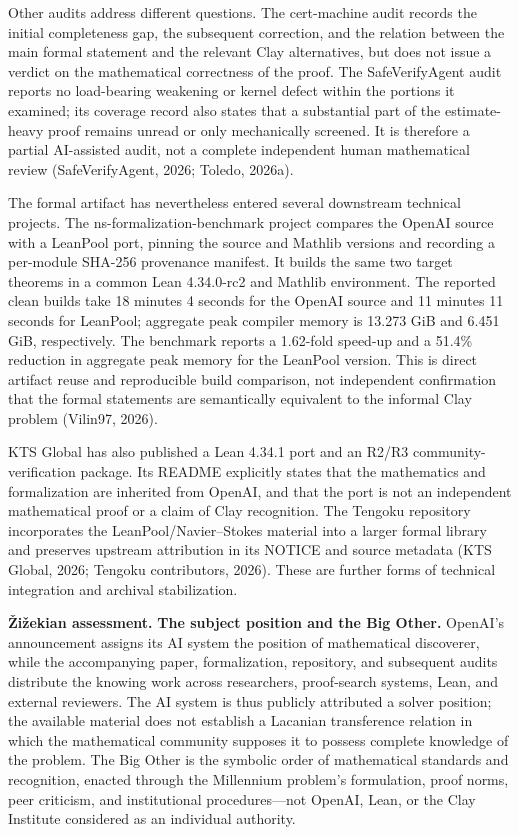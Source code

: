 \documentclass[sn-apa]{sn-jnl}
\begin{document}
Other audits address different questions. The cert-machine audit records the initial completeness gap, the subsequent correction, and the relation between the main formal statement and the relevant Clay alternatives, but does not issue a verdict on the mathematical correctness of the proof. The SafeVerifyAgent audit reports no load-bearing weakening or kernel defect within the portions it examined; its coverage record also states that a substantial part of the estimate-heavy proof remains unread or only mechanically screened. It is therefore a partial AI-assisted audit, not a complete independent human mathematical review (SafeVerifyAgent, 2026; Toledo, 2026a).

The formal artifact has nevertheless entered several downstream technical projects. The ns-formalization-benchmark project compares the OpenAI source with a LeanPool port, pinning the source and Mathlib versions and recording a per-module SHA-256 provenance manifest. It builds the same two target theorems in a common Lean 4.34.0-rc2 and Mathlib environment. The reported clean builds take 18 minutes 4 seconds for the OpenAI source and 11 minutes 11 seconds for LeanPool; aggregate peak compiler memory is 13.273 GiB and 6.451 GiB, respectively. The benchmark reports a 1.62-fold speed-up and a 51.4\% reduction in aggregate peak memory for the LeanPool version. This is direct artifact reuse and reproducible build comparison, not independent confirmation that the formal statements are semantically equivalent to the informal Clay problem (Vilin97, 2026).

KTS Global has also published a Lean 4.34.1 port and an R2/R3 community-verification package. Its README explicitly states that the mathematics and formalization are inherited from OpenAI, and that the port is not an independent mathematical proof or a claim of Clay recognition. The Tengoku repository incorporates the LeanPool/Navier–Stokes material into a larger formal library and preserves upstream attribution in its NOTICE and source metadata (KTS Global, 2026; Tengoku contributors, 2026). These are further forms of technical integration and archival stabilization.

\textbf{Žižekian assessment.} \textbf{The subject position and the Big Other.} OpenAI’s announcement assigns its AI system the position of mathematical discoverer, while the accompanying paper, formalization, repository, and subsequent audits distribute the knowing work across researchers, proof-search systems, Lean, and external reviewers. The AI system is thus publicly attributed a solver position; the available material does not establish a Lacanian transference relation in which the mathematical community supposes it to possess complete knowledge of the problem. The Big Other is the symbolic order of mathematical standards and recognition, enacted through the Millennium problem’s formulation, proof norms, peer criticism, and institutional procedures—not OpenAI, Lean, or the Clay Institute considered as an individual authority.
\end{document}
